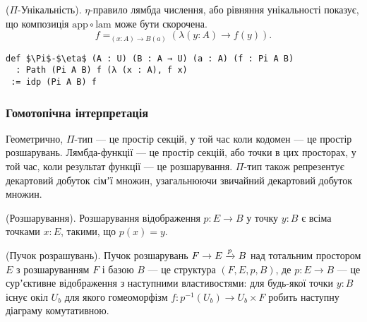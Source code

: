 \begin{theorem} ($\Pi$-Унікальність). $\eta$-правило лямбда числення, або рівняння
унікальності показує, що композиція $\mathrm{app} \circ \mathrm{lam}$ може бути скорочена.
$$f =_{(x:A)\rightarrow B(a)} (\lambda (y:A) \rightarrow f(y)).$$
\begin{lstlisting}
def $\Pi$-$\eta$ (A : U) (B : A → U) (a : A) (f : Pi A B)
  : Path (Pi A B) f (λ (x : A), f x)
 := idp (Pi A B) f
\end{lstlisting}
\end{theorem}

\newpage

\subsubsection*{Гомотопічна інтерпретація}
Геометрично, $\Pi$-тип — це простір секцій, у той час коли кодомен — це простір розшарувань.
Лямбда-функції — це простір секцій, або точки в цих просторах, у той час, коли результат функції — це розшарування.
$\Pi$-тип також репрезентує декартовий добуток сімʼї множин, узагальнюючи звичайний декартовий добуток множин.

\begin{definition} (Розшарування).
Розшарування відображення $p: E \rightarrow B$ у точку $y: B$ є всіма точками $x: E$, такими, що $p(x)=y$.
\end{definition}

\begin{definition} (Пучок розрашувань).
Пучок розшарувань $ F \rightarrow E \xrightarrow{{p}} B$ над тотальним простором $E$ з розшаруванням $F$ і базою $B$ — це
структура $(F,E,p,B)$, де $p: E \rightarrow B$ — це сурʼєктивне відображення з наступними властивостями:
для будь-якої точки $y: B$ існує окіл $U_b$ для якого гомеоморфізм $f: p^{-1}(U_b) \rightarrow U_b \times F$
робить наступну діаграму комутативною.
\begin{center}
\end{center}
\end{definition}

